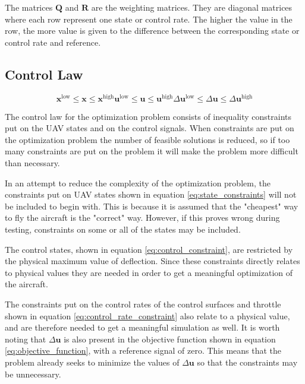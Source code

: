 The matrices $\mathbf{Q}$ and $\mathbf{R}$ are the weighting matrices. They are diagonal matrices where each row represent one state or control rate. The higher the value in the row, the more value is given to the difference between the corresponding state or control rate and reference.

\subsection{Control Law}

\begin{subequations}
\begin{equation}
	\label{eq:state_constraints}
	\mathbf{x}^{\text{low}} \leq \mathbf{x} \leq \mathbf{x}^{\text{high}}
\end{equation}
\begin{equation}
	\label{eq:control_constraint}
	\mathbf{u}^{\text{low}} \leq \mathbf{u} \leq \mathbf{u}^{\text{high}}
\end{equation}
\begin{equation}
	\label{eq:control_rate_constraint}
	\Delta\mathbf{u}^{\text{low}} \leq \Delta\mathbf{u} \leq \Delta\mathbf{u}^{\text{high}}
\end{equation}
\end{subequations}

The control law for the optimization problem consists of inequality constraints put on the UAV states and on the control signals. When constraints are put on the optimization problem the number of feasible solutions is reduced, so if too many constraints are put on the problem it will make the problem more difficult than necessary.

In an attempt to reduce the complexity of the optimization problem, the constraints put on UAV states shown in equation \ref{eq:state_constraints} will not be included to begin with. This is because it is assumed that the "cheapest" way to fly the aircraft is the "correct" way. However, if this proves wrong during testing, constraints on some or all of the states may be included.

The control states, shown in equation \ref{eq:control_constraint}, are restricted by the physical maximum value of deflection. Since these constraints directly relates to physical values they are needed in order to get a meaningful optimization of the aircraft.

The constraints put on the control rates of the control surfaces and throttle shown in equation \ref{eq:control_rate_constraint} also relate to a physical value, and are therefore needed to get a meaningful simulation as well. It is worth noting that $\Delta\mathbf{u}$ is also present in the objective function shown in equation \ref{eq:objective_function}, with a reference signal of zero. This means that the problem already seeks to minimize the values of $\Delta\mathbf{u}$ so that the constraints may be unnecessary.